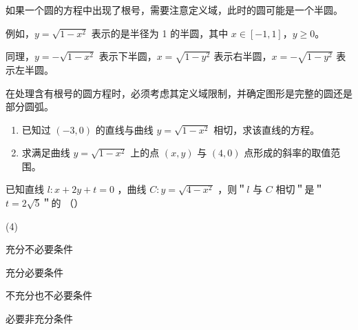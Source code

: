 \begin{theorem}
    如果一个圆的方程中出现了根号，需要注意定义域，此时的圆可能是一个半圆。

    例如，$y = \sqrt{1-x^2}$ 表示的是半径为 1 的半圆，其中 $x \in [-1, 1]$，$y \geq 0$。

    同理，$y = -\sqrt{1-x^2}$ 表示下半圆，$x = \sqrt{1-y^2}$ 表示右半圆，$x = -\sqrt{1-y^2}$ 表示左半圆。

    \begin{center}
    \end{center}

    在处理含有根号的圆方程时，必须考虑其定义域限制，并确定图形是完整的圆还是部分圆弧。
\end{theorem}

\begin{example}
    \begin{enumerate}
        \item 已知过 $(-3,0)$ 的直线与曲线 $y=\sqrt{1-x^2}$ 相切，求该直线的方程。
        \item 求满足曲线 $y=\sqrt{1-x^2}$ 上的点 $(x,y)$ 与 $(4,0)$ 点形成的斜率的取值范围。
    \end{enumerate}
\end{example}

\vspace{10em}

\begin{example}
    已知直线 $l: x+2 y+t=0$ ，曲线 $C: y=\sqrt{4-x^2}$ ，则＂$l$ 与 $C$ 相切＂是＂$t=2 \sqrt{5}$＂的 （\qquad）
    \begin{tasks}(4)
        \item 充分不必要条件
        \item 充分必要条件
        \item 不充分也不必要条件
        \item 必要非充分条件
    \end{tasks}
\end{example}

